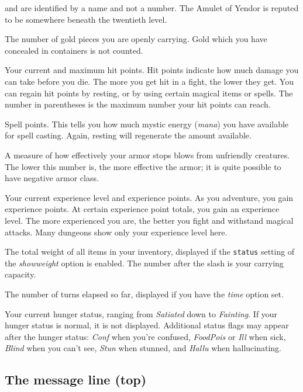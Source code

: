and are identified by a name and not a number.  The Amulet of Yendor is
reputed to be somewhere beneath the twentieth level.
\item[\bb{Gold}]
The number of gold pieces you are openly carrying.  Gold which you have
concealed in containers is not counted.
\item[\bb{Hit Points}]
Your current and maximum hit points.  Hit points indicate how much
damage you can take before you die.  The more you get hit in a fight,
the lower they get.  You can regain hit points by resting, or by using
certain magical items or spells.  The number in parentheses is the maximum
number your hit points can reach.
\item[\bb{Power}]
Spell points.  This tells you how much mystic energy ({\it mana\/})
you have available for spell casting.  Again, resting will regenerate the
amount available.
\item[\bb{Armor Class}]
A measure of how effectively your armor stops blows from unfriendly
creatures.  The lower this number is, the more effective the armor; it
is quite possible to have negative armor class.
\item[\bb{Experience}]
Your current experience level and experience points.  As you
adventure, you gain experience points.  At certain experience point
totals, you gain an experience level.  The more experienced you are,
the better you fight and withstand magical attacks.  Many dungeons
show only your experience level here.
\item[\bb{Weight}]
The total weight of all items in your inventory, displayed if the
{\tt status} setting of the
{\it showweight\/}
option is enabled. The number after the slash is your carrying capacity.
\item[\bb{Time}]
The number of turns elapsed so far, displayed if you have the
{\it time\/} option set.
\item[\bb{Hunger Status}]
Your current hunger status, ranging from %
{\it Satiated\/} down to {\it Fainting}.  If your hunger status is normal,
it is not displayed.
Additional status flags may appear after the hunger status:
{\it Conf\/} when you're confused, {\it FoodPois\/} or {\it Ill\/}
when sick, {\it Blind\/}
when you can't see, {\it Stun\/} when stunned, and {\it Hallu\/} when
hallucinating.
\elist

\subsection*{The message line (top)}

